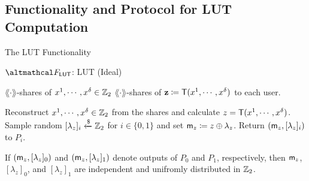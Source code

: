 \documentclass[../240906_cryptlab_flute.tex]{subfiles}
\begin{document}
\subsection{Functionality and Protocol for LUT Computation}

\begin{frame}{The LUT Functionality}

    \begin{block}{\(\mcal{F}_\msf{LUT}\): LUT (Ideal)}
        \begin{description}[Output]
            \ii[Input]
            \(\lang\cdot\rang\)-shares of \(x^1, \cdots, x^\delta \in \mathbb{Z}_2\)
            \ii[Output]
            \(\lang\cdot\rang\)-shares of \(\mathbf{z} \coloneqq \mathsf{T}(x^1, \cdots, x^\delta)\) to each
            user.
        \end{description}
        \begin{enumerate}
            \ii
            Reconstruct \(x^1, \cdots, x^\delta \in \mathbb{Z}_2\)
            from the shares
            and calculate \(z = \mathsf{T}(x^1, \cdots, x^\delta)\).
            \ii
            Sample random \([\lambda_z]_i \xleftarrow{\$} \mathbb{Z}_2\)
            for \(i \in \{0,1\}\) and set \(\mathsf{m}_z \coloneqq z \oplus \lambda_z\).
            \ii
            Return \((\mathsf{m}_z, [\lambda_z]_i)\) to \(P_i\).
        \end{enumerate}
    \end{block}

    \pause
    \begin{exampleblock}{}
        If \((\mathsf{m}_z, [\lambda_z]_0)\) and \((\mathsf{m}_z, [\lambda_z]_1)\)
        denote outputs of \(P_0\) and \(P_1\), respectively,
        then \(\mathsf{m}_z\), \([\lambda_z]_0\), and \([\lambda_z]_1\)
        are independent and unifromly distributed in \(\mathbb{Z}_2\).
    \end{exampleblock}

\end{frame}
\end{document}
